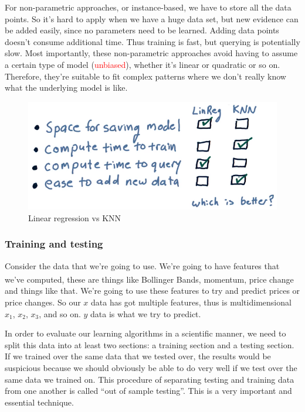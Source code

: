 \documentclass[12pt]{article}
\newcommand{\q}[1]{``#1''}
\begin{document}
For non-parametric approaches, or instance-based, we have to store all the data points. So it's hard to apply when we have a huge data set, but new evidence can be added easily, since no parameters need to be learned. Adding data points doesn't consume additional time. Thus training is fast, but querying is potentially slow. Most importantly, these non-parametric approaches avoid having to assume a certain type of model (\textcolor{red}{unbiased}), whether it's linear or quadratic or so on. Therefore, they're suitable to fit complex patterns where we don't really know what the underlying model is like. 

\begin{figure}[!ht]
\centering
\includegraphics[scale=0.45]{fig/fig84}
\caption{Linear regression vs KNN}
\end{figure}

\subsubsection{Training and testing}

Consider the data that we're going to use. We're going to have features that we've computed, these are things like Bollinger Bands\textsuperscript\textregistered, momentum, price change and things like that. We're going to use these features to try and predict prices or price changes. So our $x$ data has got multiple features, thus is multidimensional $x_1$, $x_2$, $x_3$, and so on. $y$ data is what we try to predict. 

In order to evaluate our learning algorithms in a scientific manner, we need to split this data into at least two sections: a training section and a testing section. If we trained over the same data that we tested over, the results would be suspicious because we should obviously be able to do very well if we test over the same data we trained on. This procedure of separating testing and training data from one another is called \q{out of sample testing}. This is a very important and essential technique. 
\end{document}

